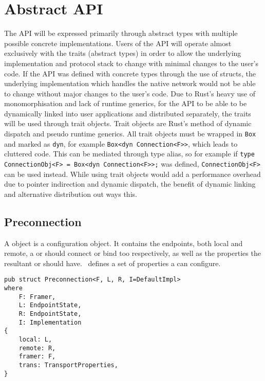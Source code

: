 \section{Abstract API}\label{sec:abstract-api}
The API will be expressed primarily through abstract types with multiple possible concrete implementations.
Users of the API will operate almost exclusively with the traits (abstract types) in order to allow the underlying
implementation and protocol stack to change with minimal changes to the user's code.
If the API was defined with concrete types through the use of structs, the underlying implementation which handles
the native network would not be able to change without major changes to the user's code.
Due to Rust's heavy use of monomorphisation and lack of runtime generics, for the API to be able to be dynamically
linked into user applications and distributed separately, the traits will be used through trait objects.
Trait objects are Rust's method of dynamic dispatch and pseudo runtime generics.
All trait objects must be wrapped in \texttt{Box} and marked as \texttt{dyn}, for example
\texttt{Box<dyn Connection<F>>}, which leads to cluttered code.
This can be mediated through type alias, so for example if \texttt{type ConnectionObj<F> = Box<dyn Connection<F>>;} was
defined, \texttt{ConnectionObj<F>} can be used instead.
While using trait objects would add a performance overhead due to pointer indirection and dynamic dispatch, the benefit
of dynamic linking and alternative distribution out ways this.

\subsection{Preconnection}\label{subsec:preconnection}
A \preconnection{} object is a configuration object.
It contains the endpoints, both local and remote, a \connection{} or \listener{} should connect or bind too
respectively, as well as the properties the resultant \connection{} or \listener{} should have.~\cite[§~5.2]{trammell_abstractapplicationlayer_2019} defines a set of properties a \preconnection{} can
configure.

\begin{lstlisting}[float=h, label=lst:preconnection, caption={The Preconnection struct, showing the four
generic parameters.}]
pub struct Preconnection<F, L, R, I=DefaultImpl>
where
    F: Framer,
    L: EndpointState,
    R: EndpointState,
    I: Implementation
{
    local: L,
    remote: R,
    framer: F,
    trans: TransportProperties,
}
\end{lstlisting}

